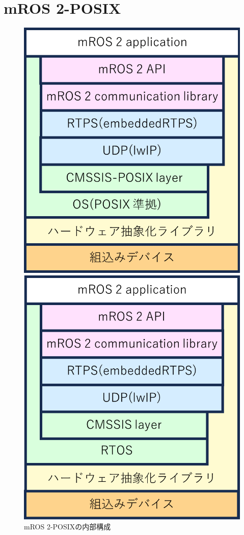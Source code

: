 \section{mROS 2-POSIX}
\begin{figure}[ht]
    \centering
    \begin{minipage}{.48\textwidth}
        \centering
        \includegraphics[width=0.9\linewidth]{images/fig1_mros2posix_a.png}
        \caption{mROS 2-POSIXの内部構成}
        \label{fig:subfig_a}
    \end{minipage}
    \hfill
    \begin{minipage}{.48\textwidth}
        \centering
        \includegraphics[width=0.9\linewidth]{images/fig1_mros2_b.png}

\end{minipage}
\end{figure}

